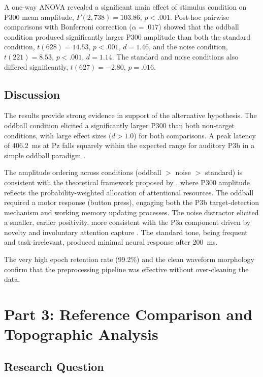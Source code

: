 \documentclass[11pt, a4paper, twocolumn]{article}
\begin{document}
A one-way ANOVA revealed a significant main effect of stimulus condition on
P300 mean amplitude, $F(2, 738) = 103.86$, $p < .001$. Post-hoc pairwise
comparisons with Bonferroni correction ($\alpha = .017$) showed that the
oddball condition produced significantly larger P300 amplitude than both
the standard condition, $t(628) = 14.53$, $p < .001$, $d = 1.46$, and the
noise condition, $t(221) = 8.53$, $p < .001$, $d = 1.14$. The standard and
noise conditions also differed significantly, $t(627) = -2.80$, $p = .016$.

\subsection{Discussion}

The results provide strong evidence in support of the alternative
hypothesis. The oddball condition elicited a significantly larger P300
than both non-target conditions, with large effect sizes ($d > 1.0$) for
both comparisons. A peak latency of 406.2~ms at Pz falls squarely within
the expected range for auditory P3b in a simple oddball paradigm
\citep{Verleger1997, Polich2007}.

The amplitude ordering across conditions (oddball $>$ noise $>$ standard)
is consistent with the theoretical framework proposed by \citet{Polich2007},
where P300 amplitude reflects the probability-weighted allocation of
attentional resources. The oddball required a motor response
(button press), engaging both the P3b target-detection mechanism and
working memory updating processes. The noise distractor elicited a
smaller, earlier positivity, more consistent with the P3a component
driven by novelty and involuntary attention capture \citep{Polich2007}.
The standard tone, being frequent and task-irrelevant, produced minimal
neural response after 200~ms.

The very high epoch retention rate (99.2\%) and the clean waveform
morphology confirm that the preprocessing pipeline was effective without
over-cleaning the data.

\section{Part 3: Reference Comparison and Topographic Analysis}

\subsection{Research Question}
\end{document}
